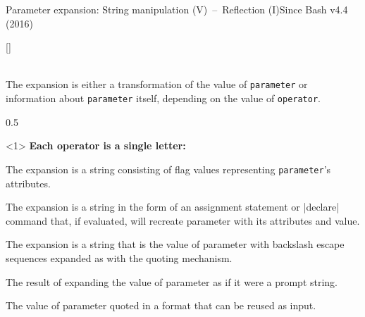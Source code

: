\begin{frame}[fragile]{Parameter expansion: String manipulation (V)~--~Reflection (I)}{Since Bash v4.4 (2016)}
    \begin{varblock*}{}[\textwidth]{}
        \begin{description}[Syntax:]
            \item[Syntax:] \\
            {\small
                The expansion is either a transformation of the value of \texttt{parameter} or information about \texttt{parameter} itself, depending on the value of \texttt{operator}.\\
            }
        \end{description}
    \end{varblock*}
    \vspace{3mm}
    \begin{overlayarea}{\textwidth}{0.5\textheight}
        \begin{onlyenv}<1>
            \textbf{Each operator is a single letter:}
            \begin{description}[X:]
                \item[a]
                {\small
                    The expansion is a string consisting of flag values representing \texttt{parameter}’s attributes.
                }
                \item[A]
                {\small
                    The expansion is a string in the form of an assignment statement or \bash|declare| command that, if evaluated, will recreate parameter with its attributes and value.
                }
                \item[E]
                {\small
                    The expansion is a string that is the value of parameter with backslash escape sequences expanded as with the \texttt{} quoting mechanism.
                }
                \item[P]
                {\small
                    The result of expanding the value of parameter as if it were a prompt string.
                }
                \item[Q]
                {\small
                    The value of parameter quoted in a format that can be reused as input.
                }
            \end{description}

\end{onlyenv}
\end{overlayarea}
\end{frame}
